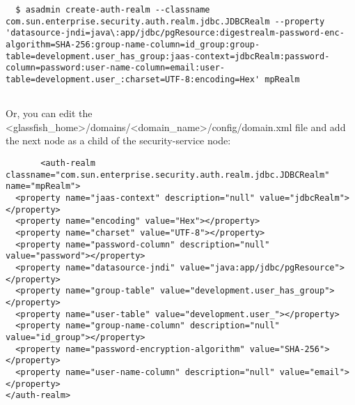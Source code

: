 \begin{lstlisting}
  $ asadmin create-auth-realm --classname com.sun.enterprise.security.auth.realm.jdbc.JDBCRealm --property 'datasource-jndi=java\:app/jdbc/pgResource:digestrealm-password-enc-algorithm=SHA-256:group-name-column=id_group:group-table=development.user_has_group:jaas-context=jdbcRealm:password-column=password:user-name-column=email:user-table=development.user_:charset=UTF-8:encoding=Hex' mpRealm
      
  \end{lstlisting}
       Or, you can edit the <glassfish\_home>/domains/<domain\_name>/config/domain.xml file and add the next node as a child of the security-service node:
        \begin{lstlisting}
       <auth-realm classname="com.sun.enterprise.security.auth.realm.jdbc.JDBCRealm" name="mpRealm">
  <property name="jaas-context" description="null" value="jdbcRealm"></property>
  <property name="encoding" value="Hex"></property>
  <property name="charset" value="UTF-8"></property>
  <property name="password-column" description="null" value="password"></property>
  <property name="datasource-jndi" value="java:app/jdbc/pgResource"></property>
  <property name="group-table" value="development.user_has_group"></property>
  <property name="user-table" value="development.user_"></property>
  <property name="group-name-column" description="null" value="id_group"></property>
  <property name="password-encryption-algorithm" value="SHA-256"></property>
  <property name="user-name-column" description="null" value="email"></property>
</auth-realm>
 \end{lstlisting}
 
 
 
 